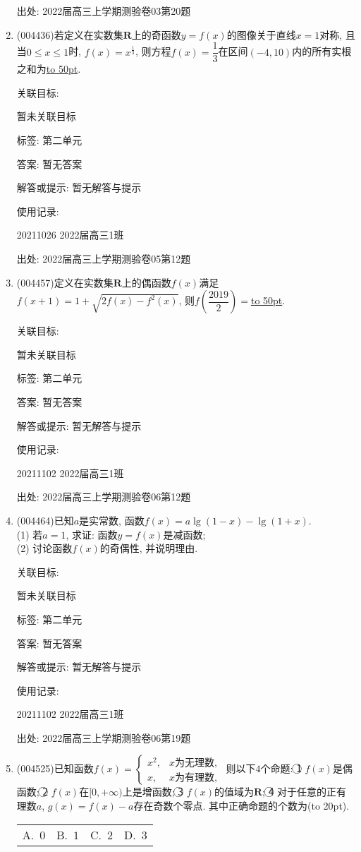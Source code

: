 \documentclass[10pt,a4paper]{article}
\newcommand{\blank}[1]{\underline{\hbox to #1pt{}}}
\newcommand{\bracket}[1]{(\hbox to #1pt{})}
\newcommand{\fourch}[4]{\par\begin{tabular}{p{.23\textwidth}p{.23\textwidth}p{.23\textwidth}p{.23\textwidth}}
A.~#1 &B.~#2& C.~#3& D.~#4
\end{tabular}}
\begin{document}
\begin{enumerate}[1.]
出处: 2022届高三上学期测验卷03第20题
\item { (004436)}若定义在实数集$\mathbf{R}$上的奇函数$y=f(x)$的图像关于直线$x=1$对称, 且当$0\le x\le 1$时, $f(x)=x^{\frac 13}$, 则方程$f(x)=\dfrac 13$在区间$(-4,10)$内的所有实根之和为\blank{50}.


关联目标:

暂未关联目标



标签: 第二单元

答案: 暂无答案

解答或提示: 暂无解答与提示

使用记录:

20211026	2022届高三1班	


出处: 2022届高三上学期测验卷05第12题
\item { (004457)}定义在实数集$\mathbf{R}$上的偶函数$f(x)$满足$f(x+1)=1+\sqrt{2f(x)-f^2(x)}$, 则$f(\dfrac{2019}{2})=$\blank{50}.


关联目标:

暂未关联目标



标签: 第二单元

答案: 暂无答案

解答或提示: 暂无解答与提示

使用记录:

20211102	2022届高三1班	


出处: 2022届高三上学期测验卷06第12题
\item { (004464)}已知$a$是实常数, 函数$f(x)=a\lg(1-x)-\lg (1+x)$.\\
(1) 若$a=1$, 求证: 函数$y=f(x)$是减函数;\\
(2) 讨论函数$f(x)$的奇偶性, 并说明理由.


关联目标:

暂未关联目标



标签: 第二单元

答案: 暂无答案

解答或提示: 暂无解答与提示

使用记录:

20211102	2022届高三1班		


出处: 2022届高三上学期测验卷06第19题
\item { (004525)}已知函数$f(x)=\begin{cases} x^2, & x\text{为无理数}, \\ x, &x\text{为有理数},   \end{cases}$ 则以下$4$个命题:
\textcircled{1} $f(x)$是偶函数; \textcircled{2} $f(x)$在$[0,+\infty)$上是增函数; \textcircled{3} $f(x)$的值域为$\mathbf{R}$; \textcircled{4} 对于任意的正有理数$a$, $g(x)=f(x)-a$存在奇数个零点.
其中正确命题的个数为\bracket{20}.
\fourch{$0$}{$1$}{$2$}{$3$}



\end{enumerate}
\end{document}
